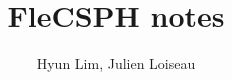 \documentclass{article}
\begin{document}
\title{FleCSPH notes}

\author{Hyun Lim, Julien Loiseau}

\maketitle














\nocite{*}



\newpage
\appendix
\end{document}
